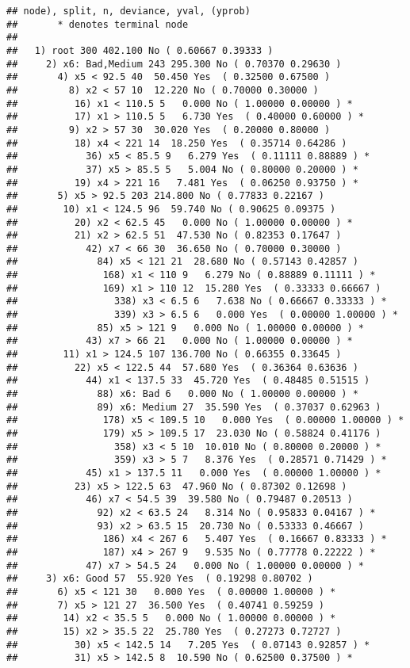 \documentclass[
]{article}
\begin{document}
\begin{verbatim}
## node), split, n, deviance, yval, (yprob)
##       * denotes terminal node
## 
##   1) root 300 402.100 No ( 0.60667 0.39333 )  
##     2) x6: Bad,Medium 243 295.300 No ( 0.70370 0.29630 )  
##       4) x5 < 92.5 40  50.450 Yes  ( 0.32500 0.67500 )  
##         8) x2 < 57 10  12.220 No ( 0.70000 0.30000 )  
##          16) x1 < 110.5 5   0.000 No ( 1.00000 0.00000 ) *
##          17) x1 > 110.5 5   6.730 Yes  ( 0.40000 0.60000 ) *
##         9) x2 > 57 30  30.020 Yes  ( 0.20000 0.80000 )  
##          18) x4 < 221 14  18.250 Yes  ( 0.35714 0.64286 )  
##            36) x5 < 85.5 9   6.279 Yes  ( 0.11111 0.88889 ) *
##            37) x5 > 85.5 5   5.004 No ( 0.80000 0.20000 ) *
##          19) x4 > 221 16   7.481 Yes  ( 0.06250 0.93750 ) *
##       5) x5 > 92.5 203 214.800 No ( 0.77833 0.22167 )  
##        10) x1 < 124.5 96  59.740 No ( 0.90625 0.09375 )  
##          20) x2 < 62.5 45   0.000 No ( 1.00000 0.00000 ) *
##          21) x2 > 62.5 51  47.530 No ( 0.82353 0.17647 )  
##            42) x7 < 66 30  36.650 No ( 0.70000 0.30000 )  
##              84) x5 < 121 21  28.680 No ( 0.57143 0.42857 )  
##               168) x1 < 110 9   6.279 No ( 0.88889 0.11111 ) *
##               169) x1 > 110 12  15.280 Yes  ( 0.33333 0.66667 )  
##                 338) x3 < 6.5 6   7.638 No ( 0.66667 0.33333 ) *
##                 339) x3 > 6.5 6   0.000 Yes  ( 0.00000 1.00000 ) *
##              85) x5 > 121 9   0.000 No ( 1.00000 0.00000 ) *
##            43) x7 > 66 21   0.000 No ( 1.00000 0.00000 ) *
##        11) x1 > 124.5 107 136.700 No ( 0.66355 0.33645 )  
##          22) x5 < 122.5 44  57.680 Yes  ( 0.36364 0.63636 )  
##            44) x1 < 137.5 33  45.720 Yes  ( 0.48485 0.51515 )  
##              88) x6: Bad 6   0.000 No ( 1.00000 0.00000 ) *
##              89) x6: Medium 27  35.590 Yes  ( 0.37037 0.62963 )  
##               178) x5 < 109.5 10   0.000 Yes  ( 0.00000 1.00000 ) *
##               179) x5 > 109.5 17  23.030 No ( 0.58824 0.41176 )  
##                 358) x3 < 5 10  10.010 No ( 0.80000 0.20000 ) *
##                 359) x3 > 5 7   8.376 Yes  ( 0.28571 0.71429 ) *
##            45) x1 > 137.5 11   0.000 Yes  ( 0.00000 1.00000 ) *
##          23) x5 > 122.5 63  47.960 No ( 0.87302 0.12698 )  
##            46) x7 < 54.5 39  39.580 No ( 0.79487 0.20513 )  
##              92) x2 < 63.5 24   8.314 No ( 0.95833 0.04167 ) *
##              93) x2 > 63.5 15  20.730 No ( 0.53333 0.46667 )  
##               186) x4 < 267 6   5.407 Yes  ( 0.16667 0.83333 ) *
##               187) x4 > 267 9   9.535 No ( 0.77778 0.22222 ) *
##            47) x7 > 54.5 24   0.000 No ( 1.00000 0.00000 ) *
##     3) x6: Good 57  55.920 Yes  ( 0.19298 0.80702 )  
##       6) x5 < 121 30   0.000 Yes  ( 0.00000 1.00000 ) *
##       7) x5 > 121 27  36.500 Yes  ( 0.40741 0.59259 )  
##        14) x2 < 35.5 5   0.000 No ( 1.00000 0.00000 ) *
##        15) x2 > 35.5 22  25.780 Yes  ( 0.27273 0.72727 )  
##          30) x5 < 142.5 14   7.205 Yes  ( 0.07143 0.92857 ) *
##          31) x5 > 142.5 8  10.590 No ( 0.62500 0.37500 ) *
\end{verbatim}
\end{document}
